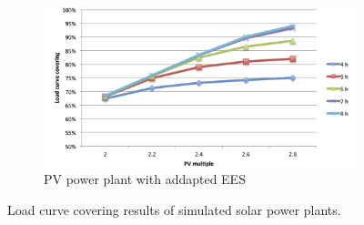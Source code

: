 \documentclass[Master,MEE,english]{twbook}%
\begin{document}
\begin{figure}[p]
        \begin{subfigure}[b]{0.75\textwidth}
                \centering
                \includegraphics[width=1.05\textwidth]{FIG/PV_LCCF}
                \caption{PV power plant with addapted EES}\label{PV_LCCF}
        \end{subfigure}%
        \caption[Load curve covering results of simulated solar power plants.]{Load curve covering results of simulated solar power plants.}\label{LCCF}
\end{figure}
\end{document}
